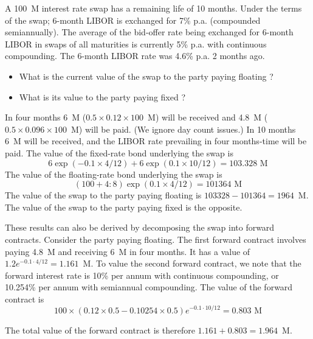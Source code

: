 \documentclass[12pt,a4paper]{book}
\begin{document}
\begin{exercise}[subtitle=Interest Rate Swap]
A 100~M interest rate swap has a remaining life of 10 months. Under the terms of the swap; 6-month LIBOR is exchanged for 7\% p.a. (compounded semiannually). The average of the bid-offer rate being exchanged for 6-month LIBOR in swaps of all maturities is currently 5\% p.a. with continuous compounding. The 6-month LIBOR rate was 4.6\% p.a. 2 months ago. 
\begin{itemize}
\item What is the current value of the swap to the party paying floating ?
\item What is its value to the party paying fixed ?
\end{itemize}
\end{exercise}
\begin{solution}
In four months 6~M ($0.5\times 0.12\times 100$~M) will be received and 4.8~M ($0.5\times 0.096\times 100$~M) will be paid. (We ignore day count issues.) In 10 months 6~M will be received, and the LIBOR rate prevailing in four months-time will be paid. The value of the fixed-rate bond underlying the swap is
\begin{equation*}
6 \exp(-0.1 \times 4/12) + 6 \exp(0.1\times  10/12) = 103.328\text{~M}
\end{equation*}
The value of the floating-rate bond underlying the swap is 
\begin{equation*}
(100 + 4:8) \exp(0.1\times  4/12) = 101364 \text{~M}
\end{equation*}
The value of the swap to the party paying floating is $103328-  101364 = 1964$~M. 
The value of the swap to the party paying fixed is the opposite. 

These results can also be derived by decomposing the swap into forward contracts. Consider the party paying floating. The first forward contract involves paying 4.8~M and receiving 6~M in four months. It has a value of $1.2e^{-0.1\cdot 4/12} = 1.161$~M.
To value the second forward contract, we note that the forward interest rate is 10\% per annum with continuous compounding, or 10.254\% per annum with semiannual compounding. The value of the forward contract is
\begin{equation*}
100\times  (0.12\times 0.5-0.10254\times 0.5)e^{-0.1\cdot 10/12} = 0.803 \text{~M}
\end{equation*}

The total value of the forward contract is therefore $1.161 + 0.803 = 1.964$~M.
\end{solution}
\end{document}
